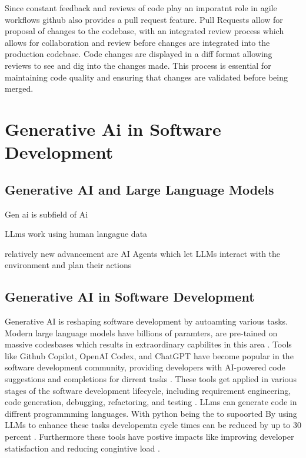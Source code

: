 Since constant feedback and reviews of code play an imporatnt role in agile workflows github also provides a pull request feature. Pull Requests allow for proposal of changes to the codebase, with an integrated review process which allows for collaboration and review before changes are integrated into the production codebase.
Code changes are displayed in a diff format allowing reviews to see and dig into the changes made.
This process is essential for maintaining code quality and ensuring that changes are validated before being merged. \cite{githubdoc}

\section{Generative Ai in Software Development}

\subsection{Generative AI and Large Language Models}
Gen ai is subfield of Ai

LLms work using human langague data

relatively new advancement are AI Agents which let LLMs interact with the environment and plan their actions

\subsection{Generative AI in Software Development}
Generative AI is reshaping software development by autoamting various tasks. Modern large language models have billions of paramters, are pre-tained on massive codesbases which results in extraordinary capbilites in this area  \cite{chenUnveilingPitfallsUnderstanding2025}.
Tools like Github Copilot, OpenAI Codex, and ChatGPT have become popular in the software development community, providing developers with AI-powered code suggestions and completions for dirrent tasks \cite{bhargavmallampatiRoleGenerativeAI2025}. These tools get applied in various stages of the software development lifecycle, including requirement engineering, code generation, debugging, refactoring, and testing \cite{houLargeLanguageModels2024, puvvadiCodingAgentsComprehensive2025,
    bhargavmallampatiRoleGenerativeAI2025 }. LLms can generate code in diffrent programmming languages. With python being the to supoorted \cite{}
By using LLMs to enhance these tasks developemtn cycle times can be reduced by up to 30 percent \cite{bhargavmallampatiRoleGenerativeAI2025,kalliamvakouResearchQuantifyingGitHub2022}. Furthermore these tools have postive impacts like improving developer statisfaction and reducing congintive load \cite{kalliamvakouResearchQuantifyingGitHub2022}.

